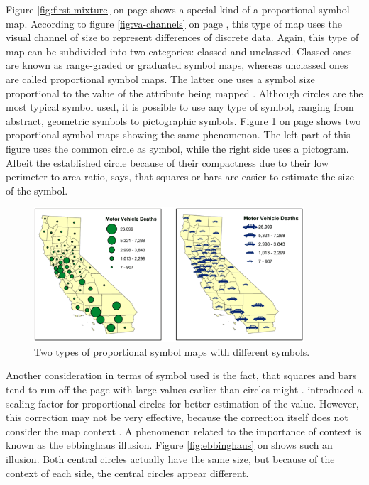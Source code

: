 Figure \ref{fig:first-mixture} on page \pageref{fig:first-mixture} shows a special kind of a proportional symbol map. According to figure \ref{fig:va-channels} on page \pageref{fig:va-channels}, this type of map uses the visual channel of size to represent differences of discrete data. Again, this type of map can be subdivided into two categories: classed and unclassed. Classed ones are known as range-graded or graduated symbol maps, whereas unclassed ones are called proportional symbol maps. The latter one uses a symbol size proportional to the value of the attribute being mapped .
Although circles are the most typical symbol used, it is possible to use any type of symbol, ranging from abstract, geometric symbols to pictographic symbols. Figure \ref{fig:different-symbols} on page \pageref{fig:different-symbols} shows two proportional symbol maps showing the same phenomenon. The left part of this figure uses the common circle as symbol, while the right side uses a pictogram. Albeit the established circle because of their compactness due to their low perimeter to area ratio, \citeauthor{Dutton.2014} says, that squares or bars are easier to estimate the size of the symbol.

\begin{figure}[!htb]
\centering
\includegraphics[height=5cm,keepaspectratio]{images/psm/symbols.png}
\caption[
    Two types of proportional symbol maps with different symbols .
]{Two types of proportional symbol maps with different symbols.}
\label{fig:different-symbols}
\end{figure}

Another consideration in terms of symbol used is the fact, that squares and bars tend to run off the page with large values earlier than circles might . \citeauthor{FLANNERY1971} introduced a scaling factor for proportional circles for better estimation of the value. However, this correction may not be very effective, because the correction itself does not consider the map context . A phenomenon related to the importance of context is known as the ebbinghaus illusion. Figure \ref{fig:ebbinghaus} on \pageref{fig:ebbinghaus} shows such an illusion. Both central circles actually have the same size, but because of the context of each side, the central circles appear different.

